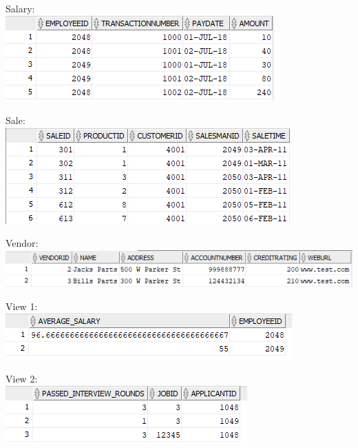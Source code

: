 \documentclass[12pt]{article}
\begin{document}
\begin{enumerate}
\begin{center}
		\end{center}
		\begin{center}
				Salary:\\
				\includegraphics[scale=1.5]{completed_diags/states/Salary}
		\end{center}
		\begin{center}
				Sale:\\
				\includegraphics[scale=1.5]{completed_diags/states/Sale}
		\end{center}
		\begin{center}
				Vendor:\\
				\includegraphics[scale=1.0]{completed_diags/states/vendor}
		\end{center}
		\begin{center}
				View 1:\\
				\includegraphics[scale=1.0]{completed_diags/states/view1}
		\end{center}
		\begin{center}
				View 2:\\
				\includegraphics[scale=1.0]{completed_diags/states/view2}
		\end{center}

\end{enumerate}
\end{document}
